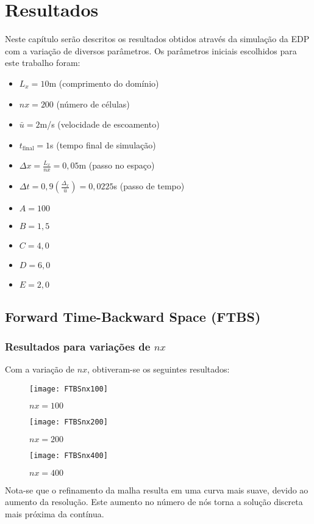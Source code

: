 \chapter{Resultados}
Neste capítulo serão descritos os resultados obtidos através da simulação da
EDP com a variação de diversos parâmetros. Os parâmetros iniciais escolhidos
para este trabalho foram:
\begin{itemize}
    \item $L_x = 10$m (comprimento do domínio)
    \item $nx = 200$ (número de células)
    \item $\bar{u} = 2$m/s (velocidade de escoamento)
    \item $t_\text{final} = 1$s  (tempo final de simulação)
    \item $\Delta x = \frac{L_x}{nx} = 0,05$m (passo no espaço)
    \item $\Delta t = 0,9\left( \frac{\Delta_x}{\bar{u}} \right) = 0,0225$s
          (passo de tempo)
    \item $A = 100$
    \item $B = 1,5$
    \item $C = 4,0$
    \item $D = 6,0$
    \item $E = 2,0$
\end{itemize}

\section{Forward Time-Backward Space (FTBS)}

\subsection{Resultados para variações de $nx$}
Com a variação de $nx$, obtiveram-se os seguintes resultados:
\begin{figure}[H]
    \centering
    \texttt{[image: FTBSnx100]}
    \caption{$nx = 100$}
\end{figure}
\begin{figure}[H]
    \centering
    \texttt{[image: FTBSnx200]}
    \caption{$nx = 200$}
\end{figure}
\begin{figure}[H]
    \centering
    \texttt{[image: FTBSnx400]}
    \caption{$nx = 400$}
\end{figure}
Nota-se que o refinamento da malha resulta em uma curva mais suave, devido ao
aumento da resolução. Este aumento no número de nós torna a solução discreta
mais próxima da contínua.

